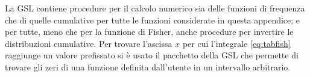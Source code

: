 La GSL contiene procedure per il calcolo numerico sia delle
funzioni di frequenza che di quelle cumulative per tutte le
funzioni considerate in questa appendice; e per tutte, meno
che per la funzione di Fisher, anche procedure per invertire
le distribuzioni cumulative.  Per trovare l'ascissa $x$ per
cui l'integrale \eqref{eq:tabfish} raggiunge un valore
prefissato si \`e usato il pacchetto della GSL che permette
di trovare gli zeri di una funzione definita dall'utente in
un intervallo arbitrario.

\clearpage

\endinput
